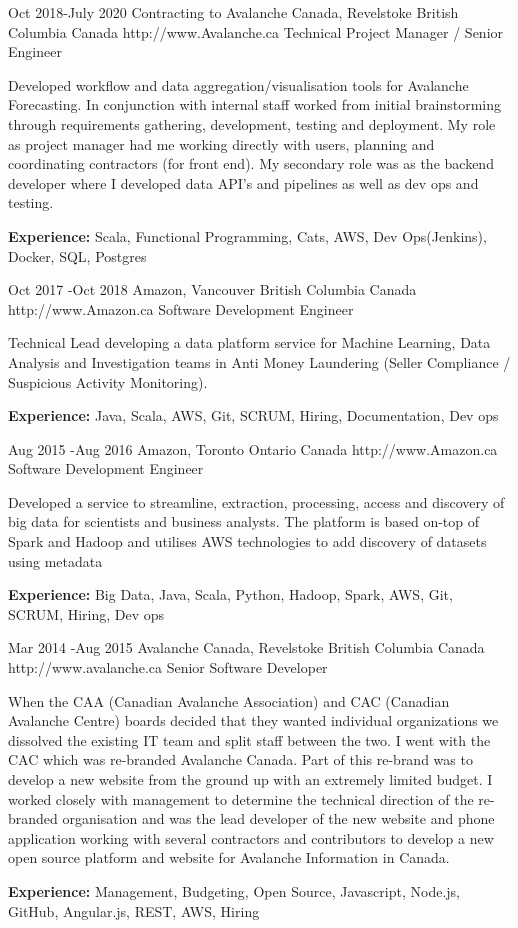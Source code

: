 \documentclass{article}
\begin{document}
\begin{job}
{Oct 2018-}{July 2020}
{Contracting to Avalanche Canada, Revelstoke British Columbia Canada}
{http://www.Avalanche.ca}
{Technical Project Manager / Senior Engineer}%
{Developed workflow and data aggregation/visualisation tools for Avalanche Forecasting. In conjunction with internal staff worked from initial brainstorming through requirements gathering, development, testing and deployment. My role as project manager had me working directly with users, planning and coordinating contractors (for front end). My secondary role was as the backend developer where I developed data API's and pipelines as well as dev ops and testing.\\
\rule{0mm}{5mm}\textbf{Experience:} Scala, Functional Programming, Cats, AWS, Dev Ops(Jenkins), Docker, SQL, Postgres}
\end{job}

\begin{job}
{Oct 2017 -}{Oct 2018}
{Amazon, Vancouver British Columbia Canada}
{http://www.Amazon.ca}
{Software Development Engineer}%
{Technical Lead developing a data platform service for Machine Learning, Data Analysis and Investigation teams in Anti Money Laundering (Seller Compliance / Suspicious Activity Monitoring). \\
\rule{0mm}{5mm}\textbf{Experience:} Java, Scala, AWS, Git, SCRUM, Hiring, Documentation, Dev ops}
\end{job}


\begin{job}
{Aug 2015 -}{Aug 2016}
{Amazon, Toronto Ontario Canada}
{http://www.Amazon.ca}
{Software Development Engineer}%
{Developed a service to streamline, extraction, processing, access and discovery of big data for scientists and business analysts. The platform is based on-top of Spark and Hadoop and utilises AWS technologies to add discovery of datasets using metadata \\
\rule{0mm}{5mm}\textbf{Experience:} Big Data, Java, Scala, Python, Hadoop, Spark, AWS, Git, SCRUM, Hiring, Dev ops}
\end{job}

\begin{job}
{Mar 2014 -}{Aug 2015}
{Avalanche Canada, Revelstoke British Columbia Canada}
{http://www.avalanche.ca}
{Senior Software Developer}%
{When the CAA (Canadian Avalanche Association) and CAC (Canadian Avalanche Centre) boards decided that they wanted individual organizations we dissolved the existing IT team and split staff between the two. I went with the CAC which was re-branded Avalanche Canada. Part of this re-brand was to develop a new website from the ground up with an extremely limited budget. I worked closely with management to determine the technical direction of the re-branded organisation and was the lead developer of the new website and phone application working with several contractors and contributors to develop a new open source platform and website for Avalanche Information in Canada. \\
\rule{0mm}{5mm}\textbf{Experience:} Management, Budgeting, Open Source, Javascript, Node.js, GitHub, Angular.js, REST, AWS, Hiring }
\end{job}
\end{document}
